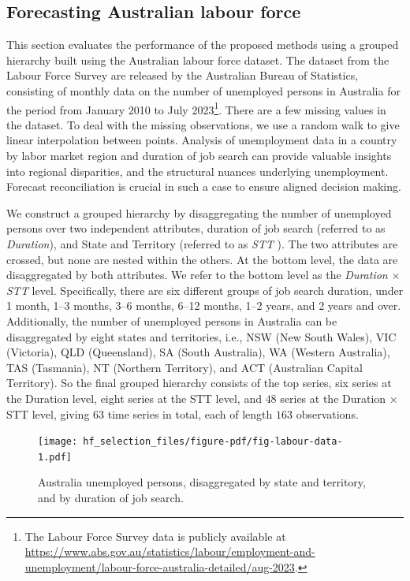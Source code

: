 \documentclass[
  12pt,
  11pt]{article}
\begin{document}
\hypertarget{sec-labour}{%
\subsection{Forecasting Australian labour force}\label{sec-labour}}

This section evaluates the performance of the proposed methods using a
grouped hierarchy built using the Australian labour force dataset. The
dataset from the Labour Force Survey are released by the Australian
Bureau of Statistics, consisting of monthly data on the number of
unemployed persons in Australia for the period from January 2010 to July
2023\footnote{The Labour Force Survey data is publicly available at
  \url{https://www.abs.gov.au/statistics/labour/employment-and-unemployment/labour-force-australia-detailed/aug-2023}.}.
There are a few missing values in the dataset. To deal with the missing
observations, we use a random walk to give linear interpolation between
points. Analysis of unemployment data in a country by labor market
region and duration of job search can provide valuable insights into
regional disparities, and the structural nuances underlying
unemployment. Forecast reconciliation is crucial in such a case to
ensure aligned decision making.

We construct a grouped hierarchy by disaggregating the number of
unemployed persons over two independent attributes, duration of job
search (referred to as \emph{Duration}), and State and Territory
(referred to as \emph{STT} ). The two attributes are crossed, but none
are nested within the others. At the bottom level, the data are
disaggregated by both attributes. We refer to the bottom level as the
\emph{Duration} \(\times\) \emph{STT} level. Specifically, there are six
different groups of job search duration, under 1 month, 1--3 months,
3--6 months, 6--12 months, 1--2 years, and 2 years and over.
Additionally, the number of unemployed persons in Australia can be
disaggregated by eight states and territories, i.e., NSW (New South
Wales), VIC (Victoria), QLD (Queensland), SA (South Australia), WA
(Western Australia), TAS (Tasmania), NT (Northern Territory), and ACT
(Australian Capital Territory). So the final grouped hierarchy consists
of the top series, six series at the Duration level, eight series at the
STT level, and \(48\) series at the Duration \(\times\) STT level,
giving \(63\) time series in total, each of length \(163\) observations.

\begin{figure}[!htb]

{\centering \texttt{[image: hf\_selection\_files/figure-pdf/fig-labour-data-1.pdf]}

}

\caption{\label{fig-labour-data}Australia unemployed persons,
disaggregated by state and territory, and by duration of job search.}

\end{figure}
\end{document}
